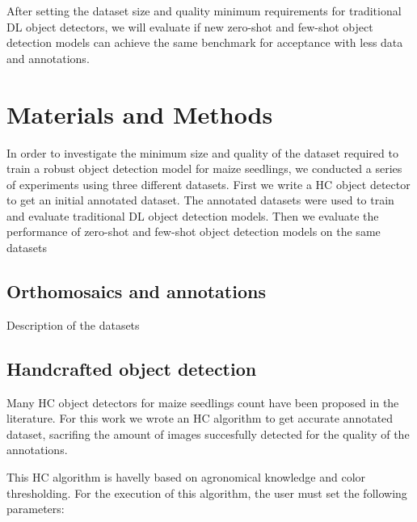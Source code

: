 \documentclass[journal,article,submit,pdftex,moreauthors]{Definitions/mdpi}
\begin{document}
After setting the dataset size and quality minimum requirements for traditional 
DL object detectors, we will evaluate if new zero-shot and few-shot object detection
models can achieve the same benchmark for acceptance with less data and annotations.

\section{Materials and Methods}

In order to investigate the minimum size and quality of the dataset required to train 
a robust object detection model for maize seedlings, we conducted a series of experiments 
using three different datasets.
First we write a HC object detector to get an initial annotated dataset.
The annotated datasets were used to train and evaluate traditional DL
object detection models.
Then we evaluate the performance of zero-shot and few-shot object detection models
on the same datasets

\subsection{Orthomosaics and annotations}

Description of the datasets

\subsection{Handcrafted object detection}

Many HC object detectors for maize seedlings count have been proposed 
in the literature. For this work we wrote an HC algorithm to get accurate 
annotated dataset, sacrifing the amount of images succesfully detected
for the quality of the annotations.

This HC algorithm is havelly based on agronomical knowledge and color thresholding.
For the execution of this algorithm, the user must set the following parameters:
\end{document}
